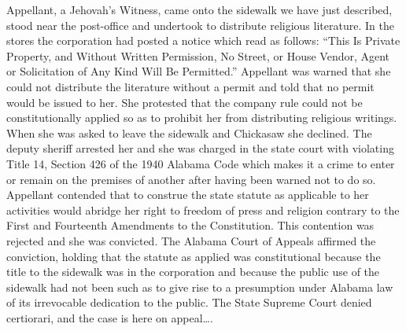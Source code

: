 Appellant, a Jehovah's Witness, came onto the sidewalk we have just described,
stood near the post-office and undertook to distribute religious literature. In
the stores the corporation had posted a notice which read as follows: ``This Is
Private Property, and Without Written Permission, No Street, or House Vendor,
Agent or Solicitation of Any Kind Will Be Permitted.''  Appellant was warned
that she could not distribute the literature without a permit and told that no
permit would be issued to her. She protested that the company rule could not be
constitutionally applied so as to prohibit her from distributing religious
writings. When she was asked to leave the sidewalk and Chickasaw she declined.
The deputy sheriff arrested her and she was charged in the state court with
violating Title 14, Section 426 of the 1940 Alabama Code which makes it a crime
to enter or remain on the premises of another after having been warned not to
do so. Appellant contended that to construe the state statute as applicable to
her activities would abridge her right to freedom of press and religion
contrary to the First and Fourteenth Amendments to the Constitution. This
contention was rejected and she was convicted. The Alabama Court of Appeals
affirmed the conviction, holding that the statute as applied was constitutional
because the title to the sidewalk was in the corporation and because the public
use of the sidewalk had not been such as to give rise to a presumption under
Alabama law of its irrevocable dedication to the public. The State Supreme
Court denied certiorari, and the case is here on appeal\ldots.

